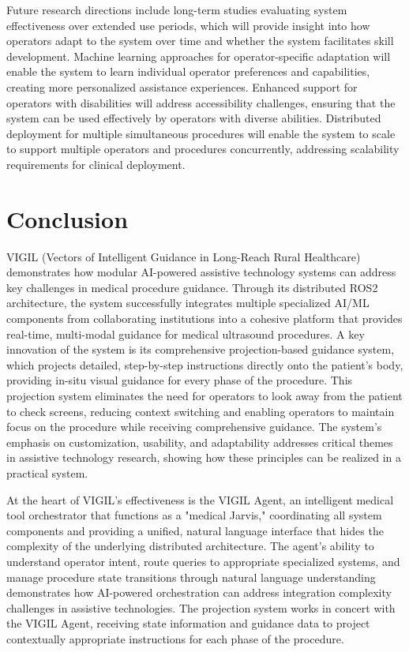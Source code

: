\documentclass[12pt,a4paper]{article}
\begin{document}
Future research directions include long-term studies evaluating system effectiveness over extended use periods, which will provide insight into how operators adapt to the system over time and whether the system facilitates skill development. Machine learning approaches for operator-specific adaptation will enable the system to learn individual operator preferences and capabilities, creating more personalized assistance experiences. Enhanced support for operators with disabilities will address accessibility challenges, ensuring that the system can be used effectively by operators with diverse abilities. Distributed deployment for multiple simultaneous procedures will enable the system to scale to support multiple operators and procedures concurrently, addressing scalability requirements for clinical deployment.

\section{Conclusion}

VIGIL (Vectors of Intelligent Guidance in Long-Reach Rural Healthcare) demonstrates how modular AI-powered assistive technology systems can address key challenges in medical procedure guidance. Through its distributed ROS2 architecture, the system successfully integrates multiple specialized AI/ML components from collaborating institutions into a cohesive platform that provides real-time, multi-modal guidance for medical ultrasound procedures. A key innovation of the system is its comprehensive projection-based guidance system, which projects detailed, step-by-step instructions directly onto the patient's body, providing in-situ visual guidance for every phase of the procedure. This projection system eliminates the need for operators to look away from the patient to check screens, reducing context switching and enabling operators to maintain focus on the procedure while receiving comprehensive guidance. The system's emphasis on customization, usability, and adaptability addresses critical themes in assistive technology research, showing how these principles can be realized in a practical system.

At the heart of VIGIL's effectiveness is the VIGIL Agent, an intelligent medical tool orchestrator that functions as a "medical Jarvis," coordinating all system components and providing a unified, natural language interface that hides the complexity of the underlying distributed architecture. The agent's ability to understand operator intent, route queries to appropriate specialized systems, and manage procedure state transitions through natural language understanding demonstrates how AI-powered orchestration can address integration complexity challenges in assistive technologies. The projection system works in concert with the VIGIL Agent, receiving state information and guidance data to project contextually appropriate instructions for each phase of the procedure.
\end{document}
